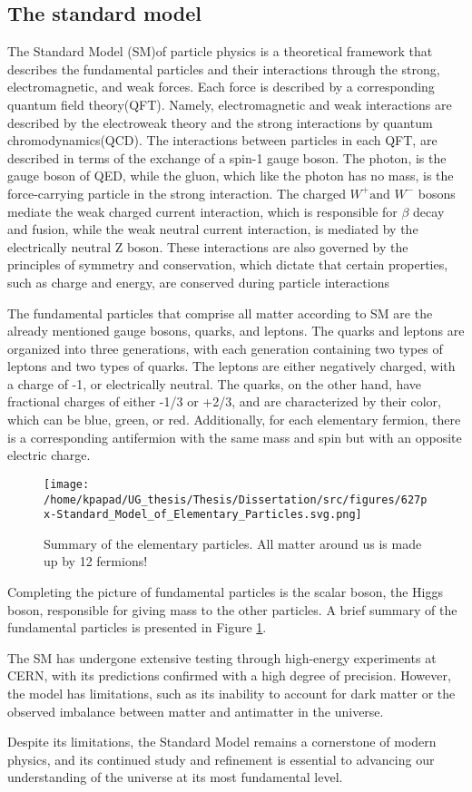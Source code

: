 \subsection{The standard model}
\label{sec:org8632faf}

The Standard Model (SM)of particle physics is a theoretical framework that describes the fundamental particles and their interactions through the strong, electromagnetic, and weak forces. Each force is described by a corresponding quantum field theory(QFT). Namely, electromagnetic and weak interactions are described by the electroweak theory and the strong interactions by quantum chromodynamics(QCD). The interactions between particles in each QFT, are described in terms of the exchange of a spin-1 gauge boson. The photon, is the gauge boson of QED, while the gluon, which like the photon has no mass, is the force-carrying particle in the strong interaction. The charged \(W^{+} \text{and }W^{-}\) bosons mediate the weak charged current interaction, which is responsible for \(\beta\) decay and fusion, while the weak neutral current interaction, is mediated by the electrically neutral Z boson. These interactions are also governed by the principles of symmetry and conservation, which dictate that certain properties, such as charge and energy, are conserved during particle interactions

The fundamental particles that comprise all matter according to SM are the already mentioned gauge bosons, quarks, and leptons. The quarks and leptons are organized into three generations, with each generation containing two types of leptons and two types of quarks. The leptons are either negatively charged, with a charge of -1, or electrically neutral. The quarks, on the other hand, have fractional charges of either -1/3 or +2/3, and are characterized by their color, which can be blue, green, or red. Additionally, for each elementary fermion, there is a corresponding antifermion with the same mass and spin but with an opposite electric charge.
\begin{figure}[ht]
\centering
\texttt{[image: /home/kpapad/UG\_thesis/Thesis/Dissertation/src/figures/627px-Standard\_Model\_of\_Elementary\_Particles.svg.png]}
\caption{Summary of the elementary particles. All matter around us is made up by 12 fermions!}
\label{fig:particles}
\end{figure}


Completing the picture of fundamental particles is the scalar boson, the Higgs boson, responsible for giving mass to the other particles. A brief summary of the fundamental particles is presented in Figure \ref{fig:particles}.

The SM has undergone extensive testing through high-energy experiments at CERN, with its predictions confirmed with a high degree of precision. However, the model has limitations, such as its inability to account for dark matter or the observed imbalance between matter and antimatter in the universe.

Despite its limitations, the Standard Model remains a cornerstone of modern physics, and its continued study and refinement is essential to advancing our understanding of the universe at its most fundamental level.
